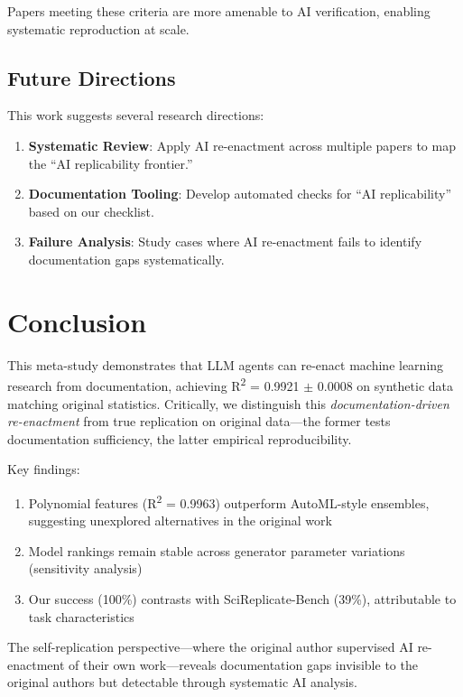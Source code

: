 \documentclass[conference]{IEEEtran}
\begin{document}
Papers meeting these criteria are more amenable to AI verification, enabling systematic reproduction at scale.

\subsection{Future Directions}

This work suggests several research directions:

\begin{enumerate}
    \item \textbf{Systematic Review}: Apply AI re-enactment across multiple papers to map the ``AI replicability frontier.''

    \item \textbf{Documentation Tooling}: Develop automated checks for ``AI replicability'' based on our checklist.

    \item \textbf{Failure Analysis}: Study cases where AI re-enactment fails to identify documentation gaps systematically.
\end{enumerate}

\section{Conclusion}

This meta-study demonstrates that LLM agents can re-enact machine learning research from documentation, achieving R\textsuperscript{2} = 0.9921 $\pm$ 0.0008 on synthetic data matching original statistics. Critically, we distinguish this \textit{documentation-driven re-enactment} from true replication on original data---the former tests documentation sufficiency, the latter empirical reproducibility.

Key findings:
\begin{enumerate}
    \item Polynomial features (R\textsuperscript{2} = 0.9963) outperform AutoML-style ensembles, suggesting unexplored alternatives in the original work
    \item Model rankings remain stable across generator parameter variations (sensitivity analysis)
    \item Our success (100\%) contrasts with SciReplicate-Bench (39\%), attributable to task characteristics
\end{enumerate}

The self-replication perspective---where the original author supervised AI re-enactment of their own work---reveals documentation gaps invisible to the original authors but detectable through systematic AI analysis.
\end{document}
